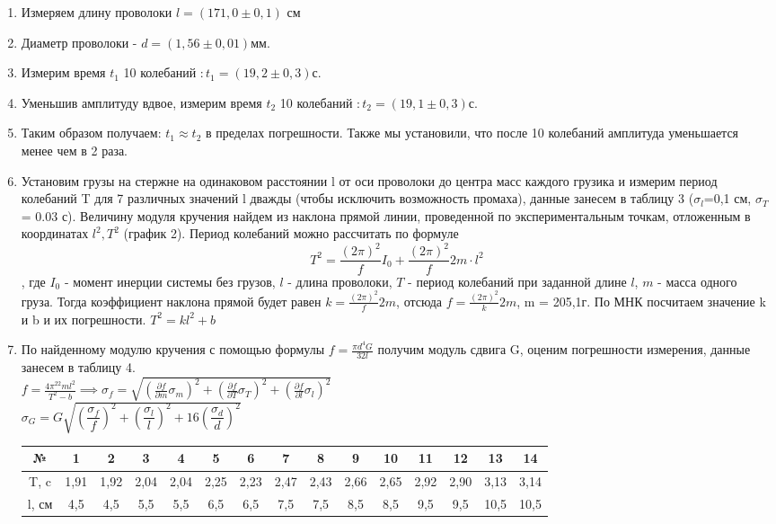 \documentclass[a4paper, 12pt]{article}%
\begin{document}
	\begin{enumerate}
		\item Измеряем длину проволоки $l = (171,0 \pm 0,1)\text{ см}$
		\item Диаметр проволоки - $d = (1,56\pm 0,01) \text{мм}$.
		\item Измерим время  $ t_{1}$ 10 колебаний $: t_{1}=(19,2\pm 0,3)\text{с}$.
		\item Уменьшив амплитуду вдвое, измерим время $t_{2}$ 10 колебаний $: t_{2}=(19,1\pm0,3)\text{с}$.
		\item Таким образом получаем: $t_{1}\approx  t_{2} \text{ в пределах погрешности}$. Также мы установили, что после 10 колебаний амплитуда уменьшается менее чем в 2 раза.
		\item Установим грузы на стержне на одинаковом расстоянии l от оси проволоки до центра масс каждого грузика и измерим период колебаний T для 7 различных значений l дважды (чтобы исключить возможность промаха), данные занесем в таблицу 3 ($\sigma_l$=0,1 см, $\sigma_T$= 0.03 с). Величину модуля кручения найдем из наклона прямой линии, проведенной по экспериментальным точкам, отложенным в координатах $l^2, T^2$ (график 2). Период колебаний можно рассчитать по формуле	$$T^2=\frac{(2 \pi)^2}{f} I_0 + \frac{(2 \pi)^2}{f} 2m \cdot l^2$$, где $I_0$ - момент инерции системы без грузов, $l$ - длина проволоки, $T$ - период колебаний при заданной длине $l$, $m$ - масса одного груза. Тогда коэффициент наклона прямой будет равен $k=\frac{(2 \pi)^2}{f} 2m$, отсюда $f=\frac{(2 \pi)^2}{k} 2m$, m = 205,1г. По МНК посчитаем значение k и b и их погрешности. $T^2=kl^2+b$
		\item По найденному модулю кручения с помощью формулы $f=\frac{\pi d^4G}{32l}$ получим модуль сдвига G, оценим погрешности измерения, данные занесем в таблицу 4.\\
		$f=\frac{4\pi^22ml^2}{T^2-b} \implies \sigma_{f}= \sqrt{(\frac{\partial f}{\partial m}\sigma_m)^2 + (\frac{\partial f}{\partial T}\sigma_{T})^2 + (\frac{\partial f}{\partial l}\sigma_{l})^2}$\\
		
		$\sigma_G = G\sqrt{\left( \dfrac{\sigma_{f}}{f} \right)^2 +\left( \dfrac{\sigma_{ l}}{l} \right)^2+ 16\left( \dfrac{\sigma_{d}}{d}\right)^2 }$
		
		
	\begin{longtable}{|c|c|c|c|c|c|c|c|c|c|c|c|c|c|c|}
					\hline
					№ & 1 &2 &3 &4 &5 &6 &7 &8 &9 &10 &11 &12 &13 &14 \\
					\hline
					T, c &1,91 &1,92 &2,04 &2,04 &2,25 &2,23 &2,47 &2,43 &2,66 &2,65 &2,92 &2,90 &3,13 &3,14
					\\ 
					\hline
					l, см &4,5 &4,5 &5,5 &5,5 &6,5 &6,5 &7,5 &7,5 &8,5 &8,5 &9,5 &9,5 &10,5 &10,5
					\\
					\hline
					

\end{longtable}
\end{enumerate}
\end{document}

